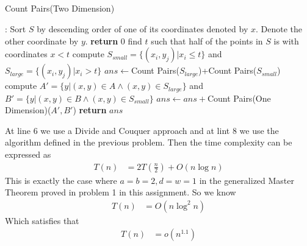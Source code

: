 \documentclass[12pt,letterpaper]{article}
\begin{document}
\subsection{}
\begin{algorithm}
    \caption{Count Pairs(Two Dimension)}\label{alg:count2d}
    \begin{algorithmic}[1]
    :
    \State Sort $S$ by descending order of one of its coordinates denoted by $x$. Denote the other coordinate by $y$.
     \textbf{return} 0
    \EndIf
    \State find $t$ such that half of the points in $S$ is with coordinates $x<t$ 
    \State compute $S_{small}=\{(x_i,y_j)|x_i\leq t\}$ and $S_{large}=\{(x_i,y_j)|x_i> t\}$  
    \State $ans\gets $Count Pairs($S_{large}$)+Count Pairs($S_{small}$)
    \State compute $A'=\{y|(x,y)\in A\wedge (x,y)\in S_{large}\}$ and $B'=\{y|(x,y)\in B\wedge (x,y)\in S_{small}\}$ 
    \State $ans\gets ans+$Count Pairs(One Dimension)($A',B'$)
    \State \textbf{return} $ans$
    \EndProcedure
    \end{algorithmic}
\end{algorithm}
At line 6 we use a Divide and Couquer approach and at lint 8 we use the algorithm defined in the previous problem. Then the time complexity can be expressed as 
\begin{align}
    T(n)&=2T(\frac{n}{2})+O(n\log n)
\end{align}
This is exactly the case where $a=b=2,d=w=1$ in the generalized Master Theorem proved in problem 1 in this assignment. So we know 
\begin{align}
    T(n)&=O(n\log^2n)
\end{align}
Which satisfies that 
\begin{align}
    T(n)&=o(n^{1.1})
\end{align}

\newpage
\end{document}
